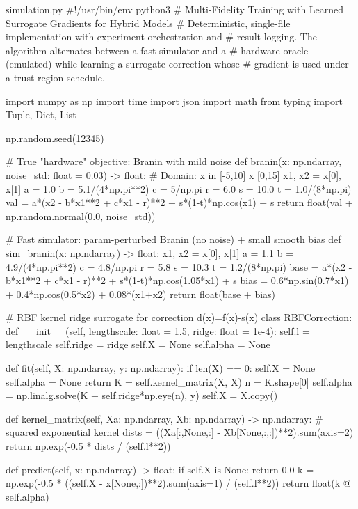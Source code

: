 \begin{filecontents*}{simulation.py}
#!/usr/bin/env python3
# Multi-Fidelity Training with Learned Surrogate Gradients for Hybrid Models
# Deterministic, single-file implementation with experiment orchestration and
# result logging. The algorithm alternates between a fast simulator and a
# hardware oracle (emulated) while learning a surrogate correction whose
# gradient is used under a trust-region schedule.

import numpy as np
import time
import json
import math
from typing import Tuple, Dict, List

np.random.seed(12345)

# True "hardware" objective: Branin with mild noise
def branin(x: np.ndarray, noise_std: float = 0.03) -> float:
    # Domain: x in [-5,10] x [0,15]
    x1, x2 = x[0], x[1]
    a = 1.0
    b = 5.1/(4*np.pi**2)
    c = 5/np.pi
    r = 6.0
    s = 10.0
    t = 1.0/(8*np.pi)
    val = a*(x2 - b*x1**2 + c*x1 - r)**2 + s*(1-t)*np.cos(x1) + s
    return float(val + np.random.normal(0.0, noise_std))

# Fast simulator: param-perturbed Branin (no noise) + small smooth bias
def sim_branin(x: np.ndarray) -> float:
    x1, x2 = x[0], x[1]
    a = 1.1
    b = 4.9/(4*np.pi**2)
    c = 4.8/np.pi
    r = 5.8
    s = 10.3
    t = 1.2/(8*np.pi)
    base = a*(x2 - b*x1**2 + c*x1 - r)**2 + s*(1-t)*np.cos(1.05*x1) + s
    bias = 0.6*np.sin(0.7*x1) + 0.4*np.cos(0.5*x2) + 0.08*(x1+x2)
    return float(base + bias)

# RBF kernel ridge surrogate for correction d(x)=f(x)-s(x)
class RBFCorrection:
    def __init__(self, lengthscale: float = 1.5, ridge: float = 1e-4):
        self.l = lengthscale
        self.ridge = ridge
        self.X = None
        self.alpha = None

    def fit(self, X: np.ndarray, y: np.ndarray):
        if len(X) == 0:
            self.X = None
            self.alpha = None
            return
        K = self.kernel_matrix(X, X)
        n = K.shape[0]
        self.alpha = np.linalg.solve(K + self.ridge*np.eye(n), y)
        self.X = X.copy()

    def kernel_matrix(self, Xa: np.ndarray, Xb: np.ndarray) -> np.ndarray:
        # squared exponential kernel
        dists = ((Xa[:,None,:] - Xb[None,:,:])**2).sum(axis=2)
        return np.exp(-0.5 * dists / (self.l**2))

    def predict(self, x: np.ndarray) -> float:
        if self.X is None:
            return 0.0
        k = np.exp(-0.5 * ((self.X - x[None,:])**2).sum(axis=1) / (self.l**2))
        return float(k @ self.alpha)


\end{filecontents*}
